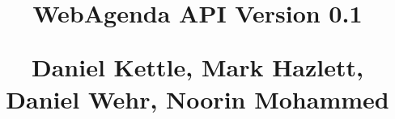 \documentclass[letterpaper,12pt]{report}
\begin{document}
{
  \centering
    \title{WebAgenda API Version 0.1 \linebreak
	    \begin{small} \linebreak
		Daniel Kettle, Mark Hazlett, Daniel Wehr, Noorin Mohammed
	    \end{small}}

    \author{}

    \maketitle
}


\end{document}
